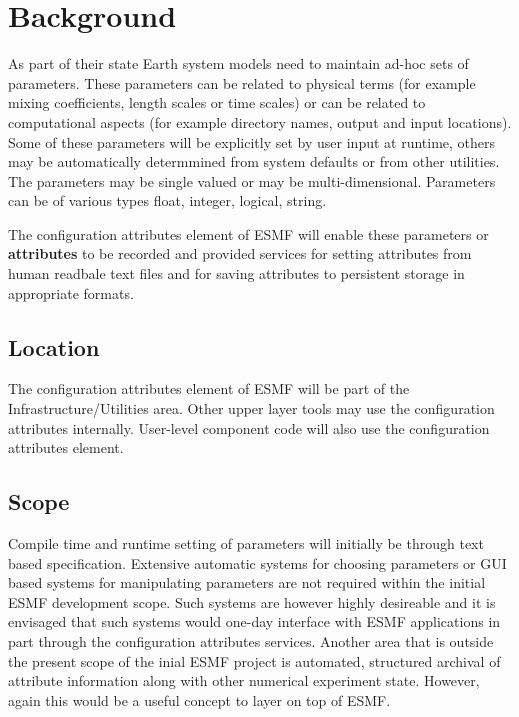 
\section{Background}
As part of their state Earth system models need to maintain ad-hoc sets of
parameters. These parameters can be related to physical terms (for example
mixing coefficients, length scales or time scales) or can be related
to computational aspects (for example directory names, output and input
locations). Some of these parameters will be explicitly set by user
input at runtime, others may be automatically determmined from system
defaults or from other utilities. The parameters may be single valued
or may be multi-dimensional. Parameters can be of various types float,
integer, logical, string.

The configuration attributes element of ESMF will enable
these parameters or {\bf attributes} to be recorded and provided services
for setting attributes from human readbale text files and for saving attributes
to persistent storage in appropriate formats.

\subsection{Location}

The configuration attributes element of ESMF will be part of the
Infrastructure/Utilities area. Other upper layer tools may use the
configuration attributes internally. User-level component code will
also use the configuration attributes element.

\subsection{Scope}

Compile time and runtime setting of parameters will initially be through
text based specification. Extensive automatic systems for choosing parameters or GUI
based systems for manipulating parameters are not required within the 
initial ESMF development scope. Such systems are however highly desireable
and it is envisaged that such systems would one-day interface with ESMF applications
in part through the configuration attributes services.
Another area that is outside the present scope of the inial ESMF project is automated,
structured archival of attribute information along with other numerical
experiment state. However, again this would be a useful concept to layer on
top of ESMF.

